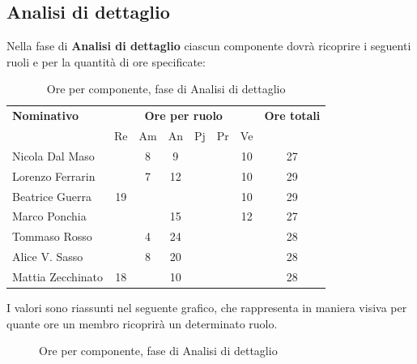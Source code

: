 \subsection{Analisi di dettaglio}
Nella fase di \textbf{Analisi di dettaglio} ciascun componente dovrà ricoprire i seguenti ruoli e per la quantità di ore specificate:

\begin{table}[H]
	\centering
	\begin{tabular}{|l|c|c|c|c|c|c|c|}
		\hline
		\textbf{Nominativo} & 
		\multicolumn{6}{c|}{\textbf{Ore per ruolo}} & 
		\textbf{Ore totali} \\
		& Re & Am & An & Pj & Pr & Ve & \\
		\hline
		Nicola Dal Maso & & 8 & 9 & & & 10 & 27 \\
		Lorenzo Ferrarin & & 7 & 12 & & & 10 & 29 \\
		Beatrice Guerra & 19 & & & & & 10 & 29 \\
		Marco Ponchia & & & 15 & & & 12 & 27 \\
		Tommaso Rosso & & 4 & 24 & & & & 28 \\
		Alice V. Sasso & & 8 & 20 & & & & 28 \\
		Mattia Zecchinato & 18 & & 10 & & & & 28 \\
		\hline
	\end{tabular}
	\caption{Ore per componente, fase di Analisi di dettaglio}
\end{table}
I valori sono riassunti nel seguente grafico, che rappresenta in maniera visiva per quante ore un membro ricoprirà un determinato ruolo.
\begin{figure}[H]
	\centering
	\caption{Ore per componente, fase di Analisi di dettaglio}
\end{figure}

